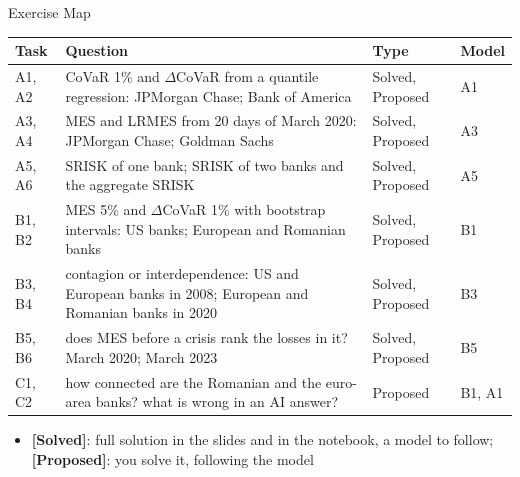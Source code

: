 \begin{frame}{Exercise Map}
\itemsize{\small}
\begin{center}
\footnotesize
\begin{tabular}{>{\raggedright\arraybackslash}p{1.1cm}>{\raggedright\arraybackslash}p{7.5cm}>{\raggedright\arraybackslash}p{1.9cm}>{\raggedright\arraybackslash}p{1.4cm}}
\toprule
\textbf{Task} & \textbf{Question} & \textbf{Type} & \textbf{Model} \\
\midrule
A1, A2 & CoVaR 1\% and $\Delta$CoVaR from a quantile regression: JPMorgan Chase; Bank of America & Solved, Proposed & A1 \\
A3, A4 & MES and LRMES from 20 days of March 2020: JPMorgan Chase; Goldman Sachs & Solved, Proposed & A3 \\
A5, A6 & SRISK of one bank; SRISK of two banks and the aggregate SRISK & Solved, Proposed & A5 \\
B1, B2 & MES 5\% and $\Delta$CoVaR 1\% with bootstrap intervals: US banks; European and Romanian banks & Solved, Proposed & B1 \\
B3, B4 & contagion or interdependence: US and European banks in 2008; European and Romanian banks in 2020 & Solved, Proposed & B3 \\
B5, B6 & does MES before a crisis rank the losses in it? March 2020; March 2023 & Solved, Proposed & B5 \\
C1, C2 & how connected are the Romanian and the euro-area banks? what is wrong in an AI answer? & Proposed & B1, A1 \\
\bottomrule
\end{tabular}
\end{center}
\begin{itemize}
    \item \textbf{[Solved]}: full solution in the slides and in the notebook, a model to follow; \textbf{[Proposed]}: you solve it, following the model
\end{itemize}
\end{frame}

